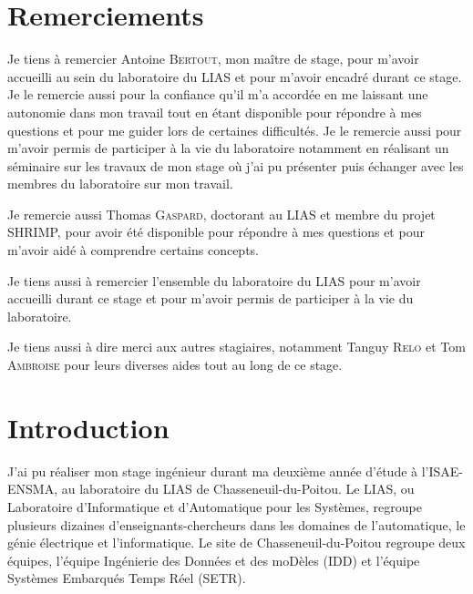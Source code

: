 \documentclass[11pt]{article}
\begin{document}
    \newpage
    \section*{Remerciements}

    Je tiens à remercier Antoine \textsc{Bertout}, mon maître de stage, pour m'avoir accueilli au sein du laboratoire du LIAS et pour m'avoir encadré durant ce stage. Je le remercie aussi pour la confiance qu'il m'a accordée en me laissant une autonomie dans mon travail tout en étant disponible pour répondre à mes questions et pour me guider lors de certaines difficultés. Je le remercie aussi pour m'avoir permis de participer à la vie du laboratoire notamment en réalisant un séminaire sur les travaux de mon stage où j'ai pu présenter puis échanger avec les membres du laboratoire sur mon travail.
    
    Je remercie aussi Thomas \textsc{Gaspard}, doctorant au LIAS et membre du projet SHRIMP, pour avoir été disponible pour répondre à mes questions et pour m'avoir aidé à comprendre certains concepts.

    Je tiens aussi à remercier l'ensemble du laboratoire du LIAS pour m'avoir accueilli durant ce stage et pour m'avoir permis de participer à la vie du laboratoire.

    Je tiens aussi à dire merci aux autres stagiaires, notamment Tanguy \textsc{Relo} et Tom \textsc{Ambroise} pour leurs diverses aides tout au long de ce stage.
    
    \newpage
    \thispagestyle{empty}
    \mbox{}
    \newpage
    \thispagestyle{empty}
    {\small \tableofcontents}

    \newpage
    \thispagestyle{empty}
    \mbox{}
    \newpage
    
    \section{Introduction}

    
    J'ai pu réaliser mon stage ingénieur durant ma deuxième année d'étude à l'ISAE-ENSMA, au laboratoire du LIAS de Chasseneuil-du-Poitou. Le LIAS, ou Laboratoire d'Informatique et d'Automatique pour les Systèmes, regroupe plusieurs dizaines d'enseignants-chercheurs dans les domaines de l'automatique, le génie électrique et l'informatique. Le site de Chasseneuil-du-Poitou regroupe deux équipes, l'équipe Ingénierie des Données et des moDèles (IDD) et l'équipe Systèmes Embarqués Temps Réel (SETR). 
\end{document}
